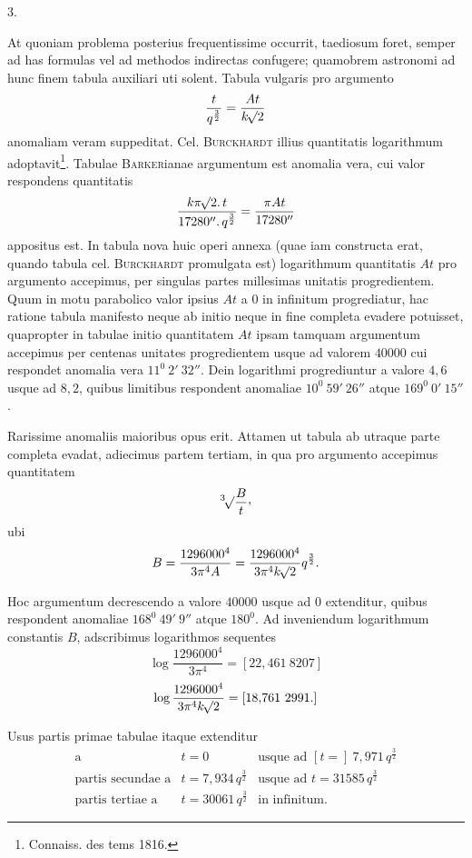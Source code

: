 \par\medskip
{}
\begin{center}3.\end{center}
\noindent\hspace*{\parindent}At quoniam problema posterius frequentissime occurrit, taediosum foret, semper ad has formulas vel ad methodos indirectas confugere; quamobrem astronomi ad hunc finem tabula auxiliari uti solent. Tabula vulgaris pro argumento
\[
\frac{t}{q^{\frac32}}=\frac{At}{k\mathord{{}^{}\!\surd}2}
\]
anomaliam veram suppeditat. Cel. \textsc{Burckhardt} illius quantitatis logarithmum adoptavit\footnote{Connaiss. des tems 1816.}. Tabulae \textsc{Barker}ianae argumentum est anomalia vera, cui valor respondens quantitatis
\[
\frac{k\pi\mathord{{}^{}\!\surd}2\mathpunct{.}t}{17280''\mathpunct{.}q^{\frac32}}=\frac{\pi At}{17280''}
\]
appositus est. In tabula nova huic operi annexa (quae iam constructa erat, quando tabula cel. \textsc{Burckhardt} promulgata est) logarithmum quantitatis \(At\) pro argumento accepimus, per singulas partes millesimas unitatis progredientem. Quum in motu parabolico valor ipsius \(At\) a \(0\) in infinitum progrediatur, hac ratione tabula manifesto neque ab initio neque in fine completa evadere potuisset, quapropter in tabulae initio quantitatem \(At\) ipsam tamquam argumentum accepimus per centenas unitates progredientem usque ad valorem \(40000\) cui respondet anomalia vera \(11^0\ 2'\ 32''\). Dein logarithmi progrediuntur a valore \(4{,}6\) usque ad \(8{,}2\), quibus limitibus respondent anomaliae \(10^0\ 59'\ 26''\) atque \(169^0\ 0'\ 15''\).
\par
{}
Rarissime anomaliis maioribus opus erit. Attamen ut tabula ab utraque parte completa evadat, adiecimus partem tertiam, in qua pro argumento accepimus quantitatem
\[
\BareRoot[3]{\frac{B}{t}}\mathpunct{\raisebox{.45ex}{,}}
\]
ubi
\[
B=\frac{1296000^4}{3\pi^4A}=\frac{1296000^4}{3\pi^4k\mathord{{}^{}\!\surd}2}q^{\frac32}.
\]
\par
Hoc argumentum decrescendo a valore \(40000\) usque ad \(0\) extenditur, quibus respondent anomaliae \(168^0\ 49'\ 9''\) atque \(180^0\). Ad inveniendum logarithmum constantis \(B\), adscribimus logarithmos sequentes
\[
\log\frac{1296000^4}{3\pi^4}=[22{,}461\ 8207]
\]
\[
\log\frac{1296000^4}{3\pi^4k\BareRoot{2}}=[18{,}761\ 2991.]
\]
\par
Usus partis primae tabulae itaque extenditur
\[
\begin{array}{rll}
\text{a}&t=0&\text{usque ad }[t=]\ 7{,}971\,q^{\frac32}\\
\text{partis secundae a}&t=7{,}934\,q^{\frac32}&\text{usque ad }t=31585\,q^{\frac32}\\
\text{partis tertiae a}&t=30061\,q^{\frac32}&\text{in infinitum.}
\end{array}
\]
